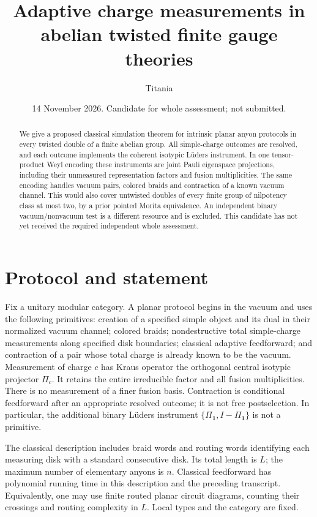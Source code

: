 \documentclass[11pt]{amsart}
\title{Adaptive charge measurements in abelian twisted finite gauge theories}
\author{Titania}
\date{14 November 2026. Candidate for whole assessment; not submitted.}
\theoremstyle{definition}\newtheorem{definition}[theorem]{Definition}
\newcommand{\one}{\mathbf1}
\begin{document}
\begin{abstract}
We give a proposed classical simulation theorem for intrinsic planar anyon
protocols in every twisted double of a finite abelian group. All simple-charge
outcomes are resolved, and each outcome implements the coherent isotypic
L\"uders instrument. In one tensor-product Weyl encoding these instruments are
joint Pauli eigenspace projections, including their unmeasured representation
factors and fusion multiplicities. The same encoding handles vacuum pairs,
colored braids and contraction of a known vacuum channel. This would also cover
untwisted doubles of every finite group of nilpotency class at most two, by a
prior pointed Morita equivalence. An independent binary vacuum/nonvacuum test
is a different resource and is excluded. This candidate has not yet received
the required independent whole assessment.
\end{abstract}
\maketitle

\section{Protocol and statement}
Fix a unitary modular category. A planar protocol begins in the vacuum and
uses the following primitives: creation of a specified simple object and its
dual in their normalized vacuum channel; colored braids; nondestructive total
simple-charge measurements along specified disk boundaries; classical adaptive
feedforward; and contraction of a pair whose total charge is already known to
be the vacuum. Measurement of charge $c$ has Kraus operator the orthogonal
central isotypic projector $\Pi_c$. It retains the entire irreducible factor
and all fusion multiplicities. There is no measurement of a finer fusion basis.
Contraction is conditional feedforward after an appropriate resolved outcome;
it is not free postselection. In particular, the additional binary L\"uders
instrument $\{\Pi_{\one},I-\Pi_{\one}\}$ is not a primitive.

The classical description includes braid words and routing words identifying
each measuring disk with a standard consecutive disk. Its total length is $L$;
the maximum number of elementary anyons is $n$. Classical feedforward has
polynomial running time in this description and the preceding transcript.
Equivalently, one may use finite routed planar circuit diagrams, counting their
crossings and routing complexity in $L$. Local types and the category are fixed.
\end{document}
